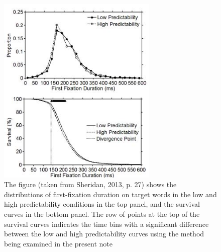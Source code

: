 \documentclass[man]{apa}%
\begin{document}
      
\begin{figure}[h] %
	\includegraphics[width=3in]{Figure1.jpg}
	\caption{The figure (taken from Sheridan, 2013, p. 27) shows the distributions of first-fixation duration on target words in the low and high predictability conditions in the top panel, and the survival curves in the bottom panel. The row of points at the top of the survival curves indicates the time bins with a significant difference between the low and high predictability curves using the method being examined in the present note}
	    	\label{sheridan}
\end{figure}		
\end{document}
